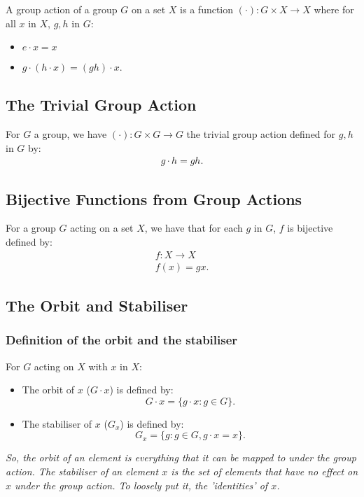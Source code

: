 \documentclass[a4paper, 12pt, twoside]{article}
\begin{document}
A group action of a group $G$ on a set $X$ is a function 
$(\cdot) : G \times X \to X$ where for all $x$ in $X$, $g, h$ in $G$:
\begin{itemize}
      \item $e \cdot x = x$ 
      \item $g \cdot (h \cdot x) = (gh) \cdot x$.
\end{itemize}

\subsection{The Trivial Group Action}

For $G$ a group, we have $(\cdot) : G \times G \to G$ the
trivial group action defined for $g, h$ in $G$ by:
\begin{align*}
      g \cdot h = gh.
\end{align*}

\subsection{Bijective Functions from Group Actions}

For a group $G$ acting on a set $X$, we have that for each $g$ in 
$G$, $f$ is bijective defined by:
\begin{gather*}
      f: X \to X \\
      f(x) = gx.
\end{gather*}

\newpage

\subsection{The Orbit and Stabiliser}

\subsubsection{Definition of the orbit and the stabiliser}

For $G$ acting on $X$ with $x$ in $X$:
\begin{itemize}
      \item The orbit of $x$ ($G \cdot x$) is defined by: $$
      G \cdot x = \{g \cdot x : g \in G\}.
      $$
      \item The stabiliser of $x$ ($G_x$) is defined by: $$
      G_x = \{g : g \in G, g \cdot x = x\}.
      $$
\end{itemize}

\textit{So, the orbit of an element is everything that it can
be mapped to under the group action. The stabiliser of an 
element $x$ is the set of elements that have no effect on $x$
under the group action. To loosely put it, the 'identities' of $x$.}
\end{document}
